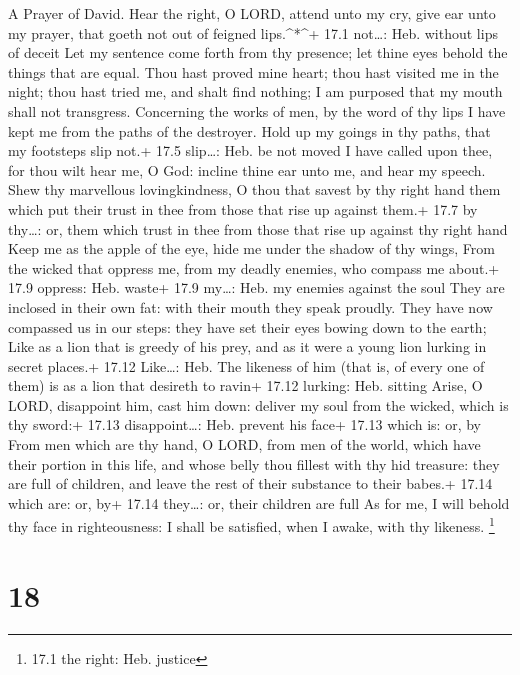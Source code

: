 A Prayer of David.  Hear the right, O LORD, attend unto my
cry, give ear unto my prayer, that goeth not out of feigned
lips.\^{}*\^{}+ 17.1 not\ldots: Heb. without lips of deceit 
Let my sentence come forth from thy presence; let thine eyes behold the
things that are equal.  Thou hast proved mine heart; thou
hast visited me in the night; thou hast tried me, and shalt find
nothing; I am purposed that my mouth shall not transgress. 
Concerning the works of men, by the word of thy lips I have kept me from
the paths of the destroyer.  Hold up my goings in thy paths,
that my footsteps slip not.+ 17.5 slip\ldots: Heb. be not moved
 I have called upon thee, for thou wilt hear me, O God:
incline thine ear unto me, and hear my speech.  Shew thy
marvellous lovingkindness, O thou that savest by thy right hand them
which put their trust in thee from those that rise up against them.+
17.7 by thy\ldots: or, them which trust in thee from those that rise up
against thy right hand  Keep me as the apple of the eye,
hide me under the shadow of thy wings,  From the wicked that
oppress me, from my deadly enemies, who compass me about.+ 17.9 oppress:
Heb. waste+ 17.9 my\ldots: Heb. my enemies against the soul
 They are inclosed in their own fat: with their mouth they
speak proudly.  They have now compassed us in our steps:
they have set their eyes bowing down to the earth;  Like as
a lion that is greedy of his prey, and as it were a young lion lurking
in secret places.+ 17.12 Like\ldots: Heb. The likeness of him (that is,
of every one of them) is as a lion that desireth to ravin+ 17.12
lurking: Heb. sitting  Arise, O LORD, disappoint him, cast
him down: deliver my soul from the wicked, which is thy sword:+ 17.13
disappoint\ldots: Heb. prevent his face+ 17.13 which is: or, by
 From men which are thy hand, O LORD, from men of the
world, which have their portion in this life, and whose belly thou
fillest with thy hid treasure: they are full of children, and leave the
rest of their substance to their babes.+ 17.14 which are: or, by+ 17.14
they\ldots: or, their children are full  As for me, I will
behold thy face in righteousness: I shall be satisfied, when I awake,
with thy likeness. \footnote{17.1 the right: Heb. justice}

\hypertarget{section-17}{%
\section{18}\label{section-17}}

